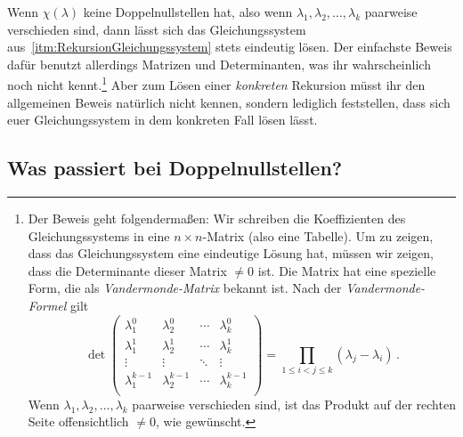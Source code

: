 Wenn $\chi(\lambda)$ keine Doppelnullstellen hat, also wenn $\lambda_1,\lambda_2,\dotsc,\lambda_k$ paarweise verschieden sind, dann lässt sich das Gleichungssystem aus~\ref{itm:RekursionGleichungssystem} stets eindeutig lösen. Der einfachste Beweis dafür benutzt allerdings Matrizen und Determinanten, was ihr wahrscheinlich noch nicht kennt.\footnote{Der Beweis geht folgendermaßen: Wir schreiben die Koeffizienten des Gleichungssystems in eine $n\times n$-Matrix (also eine Tabelle). Um zu zeigen, dass das Gleichungssystem eine eindeutige Lösung hat, müssen wir zeigen, dass die Determinante dieser Matrix $\neq 0$ ist. Die Matrix hat eine spezielle Form, die als \emph{Vandermonde-Matrix} bekannt ist. Nach der \emph{Vandermonde-Formel} gilt
	\begin{equation*}
		\det\begin{pmatrix}
			\lambda_1^0 & \lambda_2^0 & \dotsb & \lambda_k^0\\
			\lambda_1^1 & \lambda_2^1 & \dotsb & \lambda_k^1\\
			\vdots & \vdots & \ddots & \vdots\\
			\lambda_1^{k-1} & \lambda_2^{k-1} & \dotsb & \lambda_k^{k-1}\\
		\end{pmatrix}=\prod_{1\leqslant i<j\leqslant k}(\lambda_j-\lambda_i)\,.
	\end{equation*}
	Wenn $\lambda_1,\lambda_2,\dotsc,\lambda_k$ paarweise verschieden sind, ist das Produkt auf der rechten Seite offensichtlich $\neq 0$, wie gewünscht.} Aber zum Lösen einer \emph{konkreten} Rekursion müsst ihr den allgemeinen Beweis natürlich nicht kennen, sondern lediglich feststellen, dass sich euer Gleichungssystem in dem konkreten Fall lösen lässt.

\subsection*{Was passiert bei Doppelnullstellen?}

